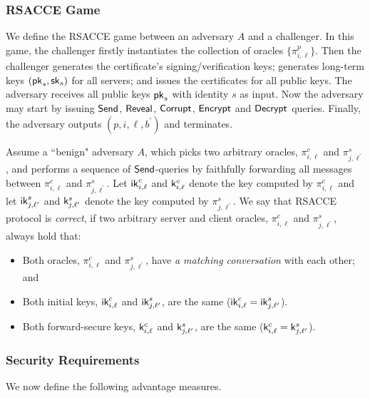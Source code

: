 \subsubsection{RSACCE Game}
We define the RSACCE game between an adversary $A$ and
a challenger.
In this game, the challenger firstly instantiates the
collection of oracles $\{\pi^p_{i,\ell}\}$.
Then the challenger generates the certificate's
signing/verification keys; generates long-term keys
$(\mathsf{pk}_s, \mathsf{sk}_s)$ for all servers; and issues the
certificates for all public keys.
The adversary receives all public keys $\mathsf{pk}_s$ with
identity $s$ as input.
Now the adversary may start by issuing $\mathsf{Send}$,
$\mathsf{Reveal}$, $\mathsf{Corrupt}$, $\mathsf{Encrypt}$ and $\mathsf{Decrypt}$ queries.
Finally, the adversary outputs
$(p, i, \ell, b^{\prime})$ and terminates.

\begin{definition}[Correctness]
 Assume a ``benign" adversary $A$, which picks two
 arbitrary oracles, $\pi^c_{i, \ell}$ and
 $\pi^s_{j, \ell^{\prime}}$, and performs a sequence of
 $\mathsf{Send}$-queries by faithfully forwarding all messages
 between $\pi^c_{i, \ell}$ and $\pi^s_{j, \ell^{\prime}}$.
 Let $\mathsf{ik}^c_{i, \ell}$ and $\mathsf{k}^c_{i, \ell}$ denote the
 key computed by $\pi^c_{i, \ell}$ and let
 $\mathsf{ik}^s_{j, \ell^{\prime}}$ and $\mathsf{k}^s_{j, \ell^{\prime}}$
 denote the key computed by $\pi^s_{j, \ell^{\prime}}$.
 We say that RSACCE protocol is \textit{correct}, if two
 arbitrary server and client oracles, $\pi^c_{i, \ell}$
 and $\pi^s_{j, \ell^{\prime}}$, always hold that:
 \begin{itemize}
  \item{Both oracles, $\pi^c_{i, \ell}$ and
  $\pi^s_{j, \ell^{\prime}}$, have
  \textit{a matching conversation} with each other; and}

  \item{Both initial keys, $\mathsf{ik}^c_{i, \ell}$ and
  $\mathsf{ik}^s_{j, \ell^{\prime}}$, are the same
  ($\mathsf{ik}^c_{i, \ell} = \mathsf{ik}^s_{j, \ell^{\prime}}$).}

  \item{Both forward-secure keys, $\mathsf{k}^c_{i, \ell}$ and
  $\mathsf{k}^s_{j, \ell^{\prime}}$, are the same
  ($\mathsf{k}^c_{i, \ell} = \mathsf{k}^s_{j, \ell^{\prime}}$).}
 \end{itemize}
\end{definition}

\subsubsection{Security Requirements}
We now define the following advantage measures.

